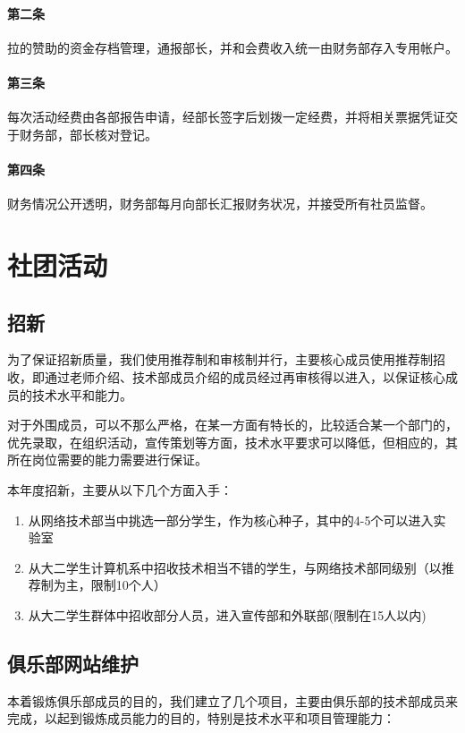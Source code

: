 \documentclass{club}
\begin{document}
\paragraph{第二条} 拉的赞助的资金存档管理，通报部长，并和会费收入统一由财务部存入专用帐户。
\paragraph{第三条} 每次活动经费由各部报告申请，经部长签字后划拨一定经费，并将相关票据凭证交于财务部，部长核对登记。
\paragraph{第四条} 财务情况公开透明，财务部每月向部长汇报财务状况，并接受所有社员监督。

\section{社团活动}

\subsection{招新}

为了保证招新质量，我们使用推荐制和审核制并行，主要核心成员使用推荐制招收，即通过老师介绍、技术部成员介绍的成员经过再审核得以进入，以保证核心成员的技术水平和能力。

对于外围成员，可以不那么严格，在某一方面有特长的，比较适合某一个部门的，优先录取，在组织活动，宣传策划等方面，技术水平要求可以降低，但相应的，其所在岗位需要的能力需要进行保证。

本年度招新，主要从以下几个方面入手：

\begin{enumerate}
    \item 从网络技术部当中挑选一部分学生，作为核心种子，其中的4-5个可以进入实验室
    \item 从大二学生计算机系中招收技术相当不错的学生，与网络技术部同级别（以推荐制为主，限制10个人）
    \item 从大二学生群体中招收部分人员，进入宣传部和外联部(限制在15人以内)
\end{enumerate}

\subsection{俱乐部网站维护}

本着锻炼俱乐部成员的目的，我们建立了几个项目，主要由俱乐部的技术部成员来完成，以起到锻炼成员能力的目的，特别是技术水平和项目管理能力：
\end{document}
